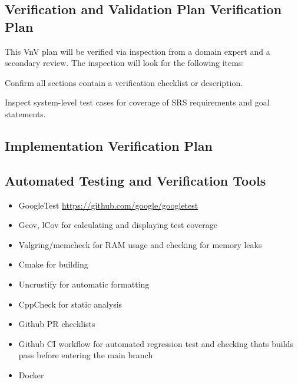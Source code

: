 \documentclass[12pt, titlepage]{article}
\begin{document}

\subsection{Verification and Validation Plan Verification Plan}

This VnV plan will be verified via inspection from a domain expert and a secondary review. The inspection will look for the following items:
\begin{todolist}
    \item Confirm all sections contain a verification checklist or description.
    \item Inspect system-level test cases for coverage of SRS requirements and goal statements.
\end{todolist}


\subsection{Implementation Verification Plan}


\subsection{Automated Testing and Verification Tools}

\begin{itemize}
    \item GoogleTest \url{https://github.com/google/googletest}
    \item Gcov, lCov for calculating and displaying test coverage
    \item Valgring/memcheck for RAM usage and checking for memory leaks
    \item Cmake for building
    \item Uncrustify for automatic formatting
    \item CppCheck for static analysis
    \item Github PR checklists
    \item Github CI workflow for automated regression test and checking thats builds pass before entering the main branch
    \item Docker
\end{itemize}
\end{document}
